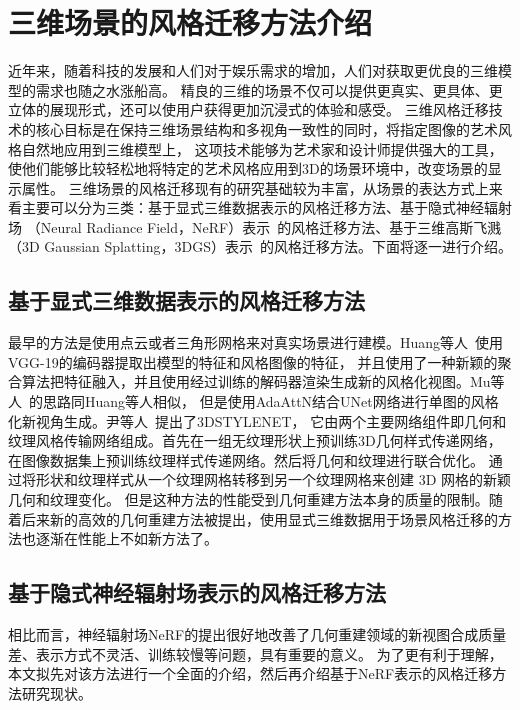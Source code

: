 \section{三维场景的风格迁移方法介绍}
近年来，随着科技的发展和人们对于娱乐需求的增加，人们对获取更优良的三维模型的需求也随之水涨船高。
精良的三维的场景不仅可以提供更真实、更具体、更立体的展现形式，还可以使用户获得更加沉浸式的体验和感受。
三维风格迁移技术的核心目标是在保持三维场景结构和多视角一致性的同时，将指定图像的艺术风格自然地应用到三维模型上，
这项技术能够为艺术家和设计师提供强大的工具，使他们能够比较轻松地将特定的艺术风格应用到3D的场景环境中，改变场景的显示属性。
三维场景的风格迁移现有的研究基础较为丰富，从场景的表达方式上来看主要可以分为三类：基于显式三维数据表示的风格迁移方法、基于隐式神经辐射场
（Neural Radiance Field，NeRF）表示~\cite{mildenhall2021nerf}的风格迁移方法、基于三维高斯飞溅（3D Gaussian Splatting，3DGS）表示~\cite{kerbl20233d}的风格迁移方法。下面将逐一进行介绍。


\subsection{基于显式三维数据表示的风格迁移方法}
最早的方法是使用点云或者三角形网格来对真实场景进行建模。Huang等人~\cite{huang2021learning}使用VGG-19的编码器提取出模型的特征和风格图像的特征，
并且使用了一种新颖的聚合算法把特征融入，并且使用经过训练的解码器渲染生成新的风格化视图。Mu等人~\cite{mu20223d}的思路同Huang等人相似，
但是使用AdaAttN结合UNet网络进行单图的风格化新视角生成。尹等人~\cite{yin20213dstylenet}提出了3DSTYLENET，
它由两个主要网络组件即几何和纹理风格传输网络组成。首先在一组无纹理形状上预训练3D几何样式传递网络，
在图像数据集上预训练纹理样式传递网络。然后将几何和纹理进行联合优化。 
通过将形状和纹理样式从一个纹理网格转移到另一个纹理网格来创建 3D 网格的新颖几何和纹理变化。
但是这种方法的性能受到几何重建方法本身的质量的限制。随着后来新的高效的几何重建方法被提出，使用显式三维数据用于场景风格迁移的方法也逐渐在性能上不如新方法了。
\subsection{基于隐式神经辐射场表示的风格迁移方法}
相比而言，神经辐射场NeRF的提出很好地改善了几何重建领域的新视图合成质量差、表示方式不灵活、训练较慢等问题，具有重要的意义。
为了更有利于理解，本文拟先对该方法进行一个全面的介绍，然后再介绍基于NeRF表示的风格迁移方法研究现状。


